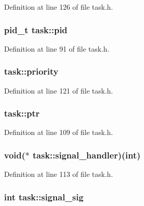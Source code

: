 Definition at line 126 of file task.\+h.

\hypertarget{structtask_ab56448ae42a75825ea923bd86648f3ae}{
\subsubsection[{pid}]{\setlength{\rightskip}{0pt plus 5cm}pid\+\_\+t task\+::pid}}\label{structtask_ab56448ae42a75825ea923bd86648f3ae}


Definition at line 91 of file task.\+h.

\hypertarget{structtask_a9ab46b5a6e7c471f1fe32db13e6636a2}{
\subsubsection[{priority}]{ task\+::priority}}\label{structtask_a9ab46b5a6e7c471f1fe32db13e6636a2}


Definition at line 121 of file task.\+h.

\hypertarget{structtask_afbc0623ab058e402e92ea084dc37ab6a}{
\subsubsection[{ptr}]{ task\+::ptr}}\label{structtask_afbc0623ab058e402e92ea084dc37ab6a}


Definition at line 109 of file task.\+h.

\hypertarget{structtask_aea4c9382e5f4f148a0a74c0680729cf0}{
\subsubsection[{signal\+\_\+handler}]{\setlength{\rightskip}{0pt plus 5cm}void($\ast$ task\+::signal\+\_\+handler)(int)}}\label{structtask_aea4c9382e5f4f148a0a74c0680729cf0}


Definition at line 113 of file task.\+h.

\hypertarget{structtask_a3d6991558f05258094bbef5c47073928}{
\subsubsection[{signal\+\_\+sig}]{\setlength{\rightskip}{0pt plus 5cm}int task\+::signal\+\_\+sig}}\label{structtask_a3d6991558f05258094bbef5c47073928}


